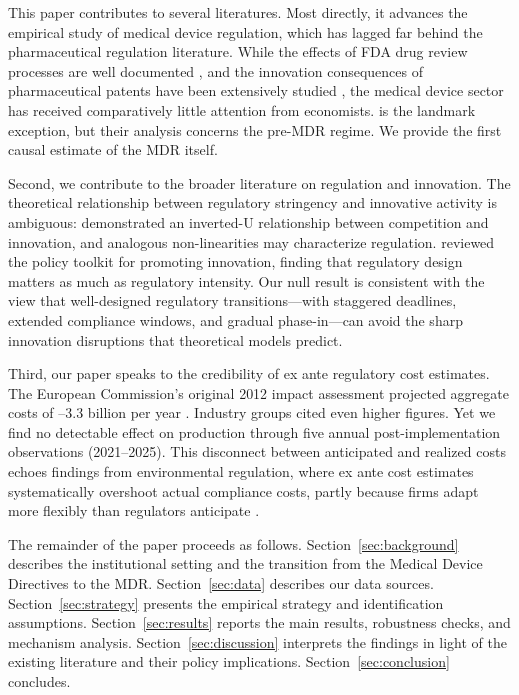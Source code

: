 \documentclass[12pt]{article}
\begin{document}
This paper contributes to several literatures. Most directly, it advances the empirical study of medical device regulation, which has lagged far behind the pharmaceutical regulation literature. While the effects of FDA drug review processes are well documented \citep{olson1997regulatory, carpenter2004approval, carpenter2010reputation}, and the innovation consequences of pharmaceutical patents have been extensively studied \citep{budish2015patents, williams2017innovation, cockburn2016patents}, the medical device sector has received comparatively little attention from economists. \citet{grennan2020regulating} is the landmark exception, but their analysis concerns the pre-MDR regime. We provide the first causal estimate of the MDR itself.

Second, we contribute to the broader literature on regulation and innovation. The theoretical relationship between regulatory stringency and innovative activity is ambiguous: \citet{aghion2005competition} demonstrated an inverted-U relationship between competition and innovation, and analogous non-linearities may characterize regulation. \citet{bloom2019toolkit} reviewed the policy toolkit for promoting innovation, finding that regulatory design matters as much as regulatory intensity. Our null result is consistent with the view that well-designed regulatory transitions---with staggered deadlines, extended compliance windows, and gradual phase-in---can avoid the sharp innovation disruptions that theoretical models predict.

Third, our paper speaks to the credibility of ex ante regulatory cost estimates. The European Commission's original 2012 impact assessment projected aggregate costs of --3.3 billion per year \citep{europeancommission2012meddev}. Industry groups cited even higher figures. Yet we find no detectable effect on production through five annual post-implementation observations (2021--2025). This disconnect between anticipated and realized costs echoes findings from environmental regulation, where ex ante cost estimates systematically overshoot actual compliance costs, partly because firms adapt more flexibly than regulators anticipate \citep{dranove2003pharmaceutical}.

The remainder of the paper proceeds as follows. Section~\ref{sec:background} describes the institutional setting and the transition from the Medical Device Directives to the MDR. Section~\ref{sec:data} describes our data sources. Section~\ref{sec:strategy} presents the empirical strategy and identification assumptions. Section~\ref{sec:results} reports the main results, robustness checks, and mechanism analysis. Section~\ref{sec:discussion} interprets the findings in light of the existing literature and their policy implications. Section~\ref{sec:conclusion} concludes.
\end{document}
